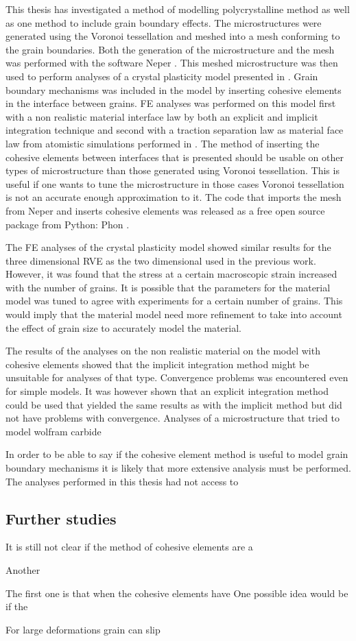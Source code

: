 \documentclass[conclusion.tex]{subfiles}
\begin{document}
This thesis has investigated a method of modelling polycrystalline method as well as one method to include grain boundary effects. The microstructures were generated using the Voronoi tessellation and meshed into a mesh conforming to the grain boundaries. Both the generation of the microstructure and the mesh was performed with the software Neper \cite{Quey20111729}. This meshed microstructure was then used to perform analyses of a crystal plasticity model presented in \cite{lillekh}. Grain boundary mechanisms was included in the model by inserting cohesive elements in the interface between grains. FE analyses was performed on this model first with a non realistic material interface law by both an explicit and implicit integration technique and second with a traction separation law as material face law from atomistic simulations performed in \cite{Gren2013}. The method of inserting the cohesive elements between interfaces that is presented should be usable on other types of microstructure than those generated using Voronoi tessellation. This is useful if one wants to tune the microstructure in those cases Voronoi tessellation is not an accurate enough approximation to it.  The code that imports the mesh from Neper and inserts cohesive elements was released as a free open source package from Python: Phon \cite{Phon}.

The FE analyses of the crystal plasticity model showed similar results for the three dimensional RVE as the two dimensional used in the previous work. However, it was found that the stress at a certain macroscopic strain increased with the number of grains. It is possible that the parameters for the material model was tuned to agree with experiments for a certain number of grains. This would imply that the material model need more refinement to take into account the effect of grain size to accurately model the material.

The results of the analyses on the non realistic material on the model with cohesive elements showed that the implicit integration method might be unsuitable for analyses of that type. Convergence problems was encountered even for simple models. It was however shown that an explicit integration method could be used that yielded the same results as with the implicit method but did not have problems with convergence. Analyses of a microstructure that tried to model wolfram carbide 

In order to be able to say if the cohesive element method is useful to model grain boundary mechanisms it is likely that more extensive analysis must be performed. The analyses performed in this thesis had not access to 


\subsection{Further studies}

It is still not clear if the method of cohesive elements are a 

Another 

The first one is that when the cohesive elements have 
One possible idea would be if the

For large deformations grain can slip
\end{document}
